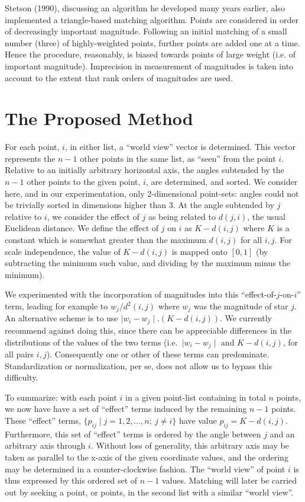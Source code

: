 Stetson (1990), discussing an algorithm he developed many years earlier,
also implemented a triangle-based matching algorithm.  Points
are considered in order of decreasingly important magnitude.  Following an initial 
matching of a small number (three) of highly-weighted points, further points are
added one at a time.  Hence the procedure, reasonably, is biased towards  
points of large weight (i.e. of important magnitude).  
Imprecision in measurement of magnitudes is taken into account to the extent
that rank orders of magnitudes are used.

\section{The Proposed Method}

For each point, $i$,  in either list, a ``world view'' vector is determined.
This vector represents the $n-1$ other points in the same
list, as ``seen'' from the point $i$.  Relative to an initially arbitrary
horizontal axis, the angles subtended by the $n-1$ other points to the
given point, $i$, are determined, and sorted.  We consider here, and in
our experimentation, only 2-dimensional point-sets: angles could not be
trivially sorted in dimensions higher than 3. At the angle subtended by
$j$ relative to $i$, we consider the effect of $j$ as being related to
$d(j,i)$, the usual Euclidean distance.  
We define the effect of $j$ on $i$ as
$K - d(i,j)$ where $K$ is a constant which is somewhat greater than
the maximum $d(i,j)$ for all $i,j$.  For scale independence, the value
of $K - d(i,j)$ is mapped onto $[0, 1]$ (by subtracting the minimum such 
value, and dividing by the maximum minus the minimum).

We experimented with the incorporation of 
magnitudes into this ``effect-of-$j$-on-$i$'' term, 
leading for example to $w_j/d^2(i,j)$ where
$w_j$ was the magnitude of star $j$.  An alternative scheme is to use
$\mid w_i - w_j \mid . (K - d(i,j))$.  We  currently recommend against doing
this, since there can be appreciable differences in the 
distributions of the values of the two terms (i.e.\ 
$\mid w_i - w_j \mid$ and $K - d(i,j)$, for all pairs $i, j$).
Consequently one or other
of these terms can predominate.  Standardization or normalization, per se, does
not allow us to bypass this difficulty.

To summarize: with each point $i$ in a given point-list containing in total
$n$ points, we now have have a set of ``effect'' terms induced by the 
remaining $n-1$ points.  These ``effect'' terms, $ \{ p_{ij} \mid j = 1, 2, 
\dots, n; \ 
j \neq i \}$ have value $p_{ij} = K - d(i,j)$.  Furthermore, this set of
``effect'' terms is 
ordered by the angle between  $j$ and an arbitrary axis through $i$.  Without
loss of generality, this arbitrary axis may be taken as parallel to the
x-axis of the given coordinate values, and the ordering may be determined
in a counter-clockwise fashion.  The ``world view'' of point $i$ is thus
expressed by this ordered set of $n-1$ values.  Matching will later be
carried out by seeking a point, or points, in the second list with a similar
``world view''.

